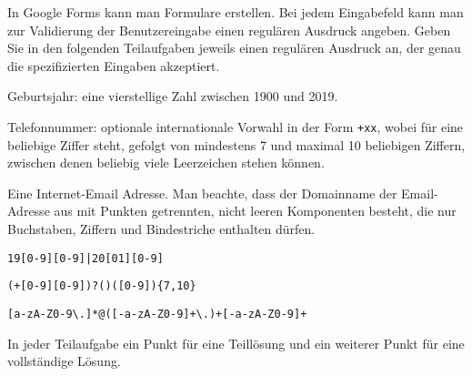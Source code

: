 In Google Forms kann man Formulare erstellen. 
Bei jedem Eingabefeld kann man zur Validierung der Benutzereingabe
einen regulären Ausdruck angeben.
Geben Sie in den folgenden Teilaufgaben jeweils einen regulären Ausdruck
an, der genau die spezifizierten Eingaben akzeptiert.
\begin{teilaufgaben}
\item Geburtsjahr: eine vierstellige Zahl zwischen 1900 und 2019.
\item Telefonnummer: optionale internationale Vorwahl in der Form
\texttt{+xx}, wobei  für eine beliebige Ziffer steht,
gefolgt von mindestens 7 und maximal 10 beliebigen Ziffern,
zwischen denen beliebig viele Leerzeichen stehen können.
\item Eine Internet-Email Adresse. Man beachte, dass der Domainname der
Email-Adresse aus mit Punkten getrennten, nicht leeren Komponenten
besteht, die nur Buchstaben, Ziffern und Bindestriche enthalten dürfen.
\end{teilaufgaben}


\begin{loesung}
\begin{teilaufgaben}
\item
\texttt{19[0-9][0-9]|20[01][0-9]}
\item
\texttt{(+[0-9][0-9])?(\blank*)([0-9]\blank*)\{7,10\}}
\item
\texttt{[a-zA-Z0-9\textbackslash.]*@([-a-zA-Z0-9]+\textbackslash.)+[-a-zA-Z0-9]+}
\qedhere
\end{teilaufgaben}
\end{loesung}

\begin{bewertung}
In jeder Teilaufgabe ein Punkt für eine Teillösung und ein weiterer Punkt für
eine vollständige Lösung.
\end{bewertung}

